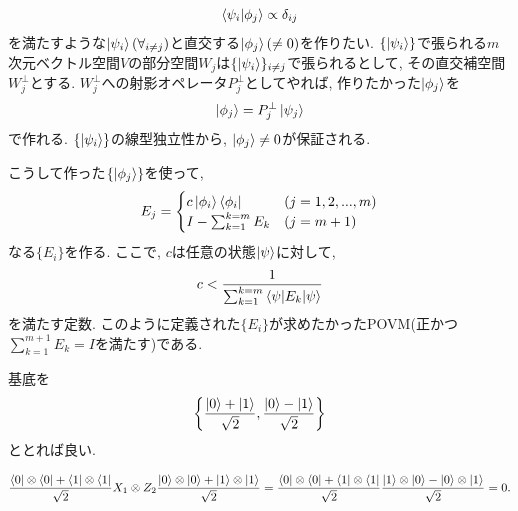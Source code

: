 \begin{ex}
    \label{ex2.64}
    \begin{align*}
        \braket{\psi_i|\phi_j} \propto \delta_{ij}
    \end{align*}
    を満たすような$\ket{\psi_i}(\forall_{i \neq j})$と直交する$\ket{\phi_j}(\neq0)$を作りたい. $\{ \ket{\psi_i}\}$で張られる$m$次元ベクトル空間$V$の部分空間$W_j$は$\{ \ket{\psi_i} \}_{i\neq j}$で張られるとして, その直交補空間$W_j^\perp$とする. $W_j^\perp$への射影オペレータ$P_j^\perp$としてやれば, 作りたかった$\ket{\phi_j}$を
    \begin{align*}
        \ket{\phi_j} = P_j^\perp \ket{\psi_j}
    \end{align*}
    で作れる. $\{ \ket{\psi_i}\}$の線型独立性から, $\ket{\phi_j} \neq 0$が保証される.
    \par
    こうして作った$\{ \ket{\phi_j}\}$を使って,
    \begin{align*}
        E_j
        =
        \begin{cases}
            c \ket{\phi_i} \bra{\phi_i} & (j=1,2, ...,m) \\
            I - \sum_{k=1}^{k=m} E_k    & (j=m+1)
        \end{cases}
    \end{align*}
    なる$\{ E_i\}$を作る. ここで, $c$は任意の状態$\ket{\psi}$に対して,
    \begin{align*}
        c < \frac{1}{\sum_{k=1}^{k=m} \braket{\psi| E_k |\psi}}
    \end{align*}
    を満たす定数. このように定義された$\{ E_i\}$が求めたかったPOVM(正かつ$\sum_{k=1}^{m+1} E_k = I$を満たす)である.
\end{ex}

\begin{ex}
    基底を
    \begin{align*}
        \left\{ \frac{\ket{0}+\ket{1}}{\sqrt{2}},  \frac{\ket{0}-\ket{1}}{\sqrt{2}}\right\}
    \end{align*}
    ととれば良い.
\end{ex}

\begin{ex}
    \begin{align*}
        \frac{\bra{0}\otimes\bra{0} + \bra{1}\otimes \bra{1}}{\sqrt{2}}
        X_1 \otimes Z_2
        \frac{\ket{0} \otimes \ket{0} + \ket{1} \otimes \ket{1}}{\sqrt{2}}
        =
        \frac{\bra{0}\otimes\bra{0} + \bra{1}\otimes \bra{1}}{\sqrt{2}}
        \frac{\ket{1} \otimes \ket{0} - \ket{0} \otimes \ket{1}}{\sqrt{2}}
        =0.
    \end{align*}
\end{ex}

